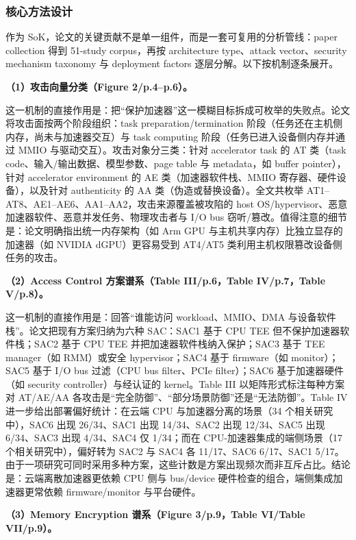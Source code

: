 \documentclass[11pt]{ctexart}
\begin{document}
\subsubsection{核心方法设计}
作为 SoK，论文的关键贡献不是单一组件，而是一套可复用的分析管线：paper collection 得到 51-study corpus，再按 architecture type、attack vector、security mechanism taxonomy 与 deployment factors 逐层分解。以下按机制逐条展开。\par
\noindent\textbf{（1）攻击向量分类（Figure 2/p.4--p.6）。}\par
这一机制的直接作用是：把``保护加速器''这一模糊目标拆成可枚举的失败点。论文将攻击面按两个阶段组织：task preparation/termination 阶段（任务还在主机侧内存，尚未与加速器交互）与 task computing 阶段（任务已进入设备侧内存并通过 MMIO 与驱动交互）。攻击对象分三类：针对 accelerator task 的 AT 类（task code、输入/输出数据、模型参数、page table 与 metadata，如 buffer pointer），针对 accelerator environment 的 AE 类（加速器软件栈、MMIO 寄存器、硬件设备），以及针对 authenticity 的 AA 类（伪造或替换设备）。全文共枚举 AT1--AT8、AE1--AE6、AA1--AA2，攻击来源覆盖被攻陷的 host OS/hypervisor、恶意加速器软件、恶意并发任务、物理攻击者与 I/O bus 窃听/篡改。值得注意的细节是：论文明确指出统一内存架构（如 Arm GPU 与主机共享内存）比独立显存的加速器（如 NVIDIA dGPU）更容易受到 AT4/AT5 类利用主机权限篡改设备侧任务的攻击。\par
\noindent\textbf{（2）Access Control 方案谱系（Table III/p.6，Table IV/p.7，Table V/p.8）。}\par
这一机制的直接作用是：回答``谁能访问 workload、MMIO、DMA 与设备软件栈''。论文把现有方案归纳为六种 SAC：SAC1 基于 CPU TEE 但不保护加速器软件栈；SAC2 基于 CPU TEE 并把加速器软件栈纳入保护；SAC3 基于 TEE manager（如 RMM）或安全 hypervisor；SAC4 基于 firmware（如 monitor）；SAC5 基于 I/O bus 过滤（CPU bus filter、PCIe filter）；SAC6 基于加速器硬件（如 security controller）与经认证的 kernel。Table III 以矩阵形式标注每种方案对 AT/AE/AA 各攻击是``完全防御''、``部分场景防御''还是``无法防御''。Table IV 进一步给出部署偏好统计：在云端 CPU 与加速器分离的场景（34 个相关研究中），SAC6 出现 26/34、SAC1 出现 14/34、SAC2 出现 12/34、SAC5 出现 6/34、SAC3 出现 4/34、SAC4 仅 1/34；而在 CPU-加速器集成的端侧场景（17 个相关研究中），偏好转为 SAC2 与 SAC4 各 11/17、SAC6 6/17、SAC1 5/17。由于一项研究可同时采用多种方案，这些计数是方案出现频次而非互斥占比。结论是：云端离散加速器更依赖 CPU 侧与 bus/device 硬件检查的组合，端侧集成加速器更常依赖 firmware/monitor 与平台硬件。\par
\noindent\textbf{（3）Memory Encryption 谱系（Figure 3/p.9，Table VI/Table VII/p.9）。}\par
\end{document}
